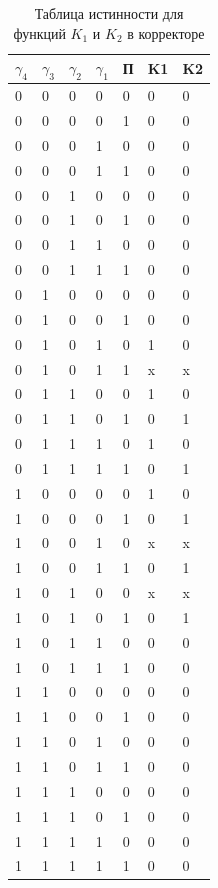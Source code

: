 \documentclass[a4paper,14pt]{article}
\begin{document}
\begin{table}[H]
	\begin{center}
		\caption{\label{tab:dvKorr} Таблица истинности для функций $K_1$ и $K_2$ в корректоре}
	\begin{tabular}{|l|l|l|l|l|l|l|}
		\hline
		$\gamma_4$ & $\gamma_3$ & $\gamma_2$ & $\gamma_1$ & П & K1 & K2 \\ \hline
		0  & 0  & 0  & 0  & 0 & 0  & 0  \\ \hline
		0  & 0  & 0  & 0  & 1 & 0  & 0  \\ \hline
		0  & 0  & 0  & 1  & 0 & 0  & 0  \\ \hline
		0  & 0  & 0  & 1  & 1 & 0  & 0  \\ \hline
		0  & 0  & 1  & 0  & 0 & 0  & 0  \\ \hline
		0  & 0  & 1  & 0  & 1 & 0  & 0  \\ \hline
		0  & 0  & 1  & 1  & 0 & 0  & 0  \\ \hline
		0  & 0  & 1  & 1  & 1 & 0  & 0  \\ \hline
		0  & 1  & 0  & 0  & 0 & 0  & 0  \\ \hline
		0  & 1  & 0  & 0  & 1 & 0  & 0  \\ \hline
		0  & 1  & 0  & 1  & 0 & 1  & 0  \\ \hline
		0  & 1  & 0  & 1  & 1 & x  & x  \\ \hline
		0  & 1  & 1  & 0  & 0 & 1  & 0  \\ \hline
		0  & 1  & 1  & 0  & 1 & 0  & 1  \\ \hline
		0  & 1  & 1  & 1  & 0 & 1  & 0  \\ \hline
		0  & 1  & 1  & 1  & 1 & 0  & 1  \\ \hline
		1  & 0  & 0  & 0  & 0 & 1  & 0  \\ \hline
		1  & 0  & 0  & 0  & 1 & 0  & 1  \\ \hline
		1  & 0  & 0  & 1  & 0 & x  & x  \\ \hline
		1  & 0  & 0  & 1  & 1 & 0  & 1  \\ \hline
		1  & 0  & 1  & 0  & 0 & x  & x  \\ \hline
		1  & 0  & 1  & 0  & 1 & 0  & 1  \\ \hline
		1  & 0  & 1  & 1  & 0 & 0  & 0  \\ \hline
		1  & 0  & 1  & 1  & 1 & 0  & 0  \\ \hline
		1  & 1  & 0  & 0  & 0 & 0  & 0  \\ \hline
		1  & 1  & 0  & 0  & 1 & 0  & 0  \\ \hline
		1  & 1  & 0  & 1  & 0 & 0  & 0  \\ \hline
		1  & 1  & 0  & 1  & 1 & 0  & 0  \\ \hline
		1  & 1  & 1  & 0  & 0 & 0  & 0  \\ \hline
		1  & 1  & 1  & 0  & 1 & 0  & 0  \\ \hline
		1  & 1  & 1  & 1  & 0 & 0  & 0  \\ \hline
		1  & 1  & 1  & 1  & 1 & 0  & 0  \\ \hline
	\end{tabular}
\end{center}
\end{table}
\end{document}
